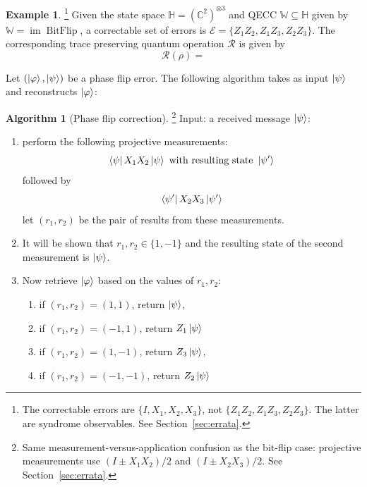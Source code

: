 \documentclass[12pt]{article}
\theoremstyle{plain}
\theoremstyle{definition}
\newtheorem{example}[thm]{Example}
\newtheorem{algorithm}[thm]{Algorithm}
\newcommand{\bb}[1]{\mathbb{#1}}
\newcommand{\scr}[1]{\mathscr{#1}}
\newcommand{\call}[1]{\mathcal{#1}}
\begin{document}
\begin{example}\footnote{The correctable errors are $\{I,X_1,X_2,X_3\}$, not $\{Z_1Z_2,Z_1Z_3,Z_2Z_3\}$. The latter are syndrome observables. See Section~\ref{sec:errata}.}
Given the state space $\bb{H} = (\bb{C}^2)^{\otimes 3}$ and QECC $\bb{W} \subseteq \bb{H}$ given by $\bb{W} = \operatorname{im}\operatorname{BitFlip}$, a correctable set of errors is $\scr{E} = \lbrace Z_1Z_2,Z_1Z_3,Z_2Z_3\rbrace$. The corresponding trace preserving quantum operation $\call{R}$ is given by
\begin{equation}
\call{R}(\rho) = 
\end{equation}
\end{example}

Let $(\ket{\varphi},\ket{\psi})$ be a phase flip error. The following algorithm takes as input $\ket{\psi}$ and reconstructs $\ket{\varphi}$:
\begin{algorithm}[Phase flip correction]\footnote{Same measurement-versus-application confusion as the bit-flip case: projective measurements use $(I\pm X_1X_2)/2$ and $(I\pm X_2X_3)/2$. See Section~\ref{sec:errata}.}
Input: a received message $\ket{\psi}$:
\begin{enumerate}
\item perform the following projective measurements:
\begin{equation}
\bra{\psi} X_1 X_2 \ket{\psi} \text{ with resulting state }\ket{\psi'}
\end{equation}
followed by
\begin{equation}
\bra{\psi'} X_2 X_3 \ket{\psi'}
\end{equation}
let $(r_1,r_2)$ be the pair of results from these measurements.
\item It will be shown that $r_1, r_2 \in \lbrace 1, -1\rbrace$ and the resulting state of the second measurement is $\ket{\psi}$.
\item Now retrieve $\ket{\varphi}$ based on the values of $r_1,r_2$:
\begin{enumerate}
\item if $(r_1,r_2) = (1,1)$, return $\ket{\psi}$,
\item if $(r_1,r_2) = (-1,1)$, return $Z_1 \ket{\psi}$
\item if $(r_1,r_2) = (1,-1)$, return $Z_3 \ket{\psi}$,
\item if $(r_1,r_2) = (-1,-1)$, return $Z_2 \ket{\psi}$
\end{enumerate}
\end{enumerate}
\end{algorithm}
\end{document}
